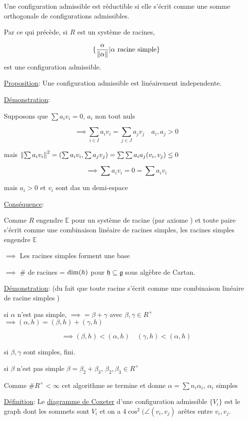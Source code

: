 Une configuration admissible est réductible si elle s'écrit comme une somme orthogonale de configurations admissibles. 


Par ce qui précède, si \(R\) est un système de racines, 

\[ \{ \frac{\alpha}{\norm{\alpha}} | \alpha \text{ racine simple}  \}  \] est une configuration admissible.


\underline{Proposition}: Une configuration admissible est linéairement independente. 

\underline{Démonstration}:

Supposons que \(\sum a_i v_i =0\), \(a_i\) non tout nuls 

\[ \implies \sum_{i\in I}a_i v_i = \sum_{j\in J} a_j v_j \quad a_i , a_j > 0   \]

mais \(\norm{\sum a_i v_{i}}^{2}= \left( \sum a_i v_i , \sum a_j v_j \right)  = \sum \sum a_i a_j (v_i , v_j ) \leq 0\)

\[ \implies \sum a_i v_i = 0 = \sum a_i v_i  \]

mais \(a_i > 0 \) et \(v_i\) sont das un demi-espace \lightning

\underline{Conséquence}:

Comme \(R\) engendre \(\mathds{E}\) pour un système de racine (par axiome ) et toute paire s'écrit comme une combinaison linéaire de racines simples, les racines simples engendre \(\mathds{E}\)

\(\implies \) Les racines simples forment une base 

\(\implies \) \# de racines = \({\rm{}dim}(h)\) pour \(\mathfrak{h} \subseteq \mathfrak{g}\) sous algèbre de Cartan.

\underline{Démonstration}: (du fait que toute racine s'écrit comme une combinaison linéaire de racine simples )

si \(\alpha\) n'est pas simple, \(\implies =\beta + \gamma\) avec \(\beta, \gamma \in R^+\)  \(\implies (\alpha, h) = (\beta, h) + (\gamma ,h) \)

\[ \implies (\beta ,h) < (\alpha, h) \quad (\gamma, h) < (\alpha, h)\]

si \(\beta ,\gamma \) sont simples, fini.

si \(\beta\) n'est pas simple \(\beta = \beta_2 + \beta_3 \), \(\beta_2, \beta_3 \in R^+\)

Comme \(\# R^{+} < \infty\) cet algorithme se termine et donne \(\alpha = \sum n_i \alpha_i\), \(\alpha_i \) simples 


\underline{Définition}: Le \underline{diagramme de Coxeter} d'une configuration admissible \(\{ V_i \} \) est le graph dont les sommets sont \(V_i\) et on a \(4\cos^{2}(\angle (v_i , v_j )\)  arêtes entre \(v_i , v_j \). 

